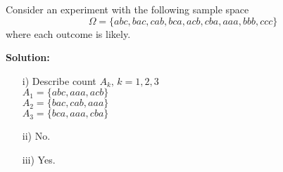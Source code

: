 \documentclass[12pt,a4paper]{article}
\begin{document}
\begin{quest}

Consider an experiment with the following sample space  $$\Omega = \lbrace abc, bac, cab, bca, acb, cba, aaa, bbb, ccc\rbrace$$
where each outcome is likely.

\end{quest}

\textbf{Solution:}\\
\begin{itemize}
	\item[i)] Describe count $A_k,\, k=1,2,3$\\
	
	$A_1=\lbrace abc,aaa,acb\rbrace$\\
	$A_2=\lbrace bac,cab,aaa\rbrace$\\
	$A_3=\lbrace bca,aaa,cba\rbrace$
	\item[ii)] No.\\
	 \item[iii)] Yes.
 \end{itemize}
 
 
\end{document}
